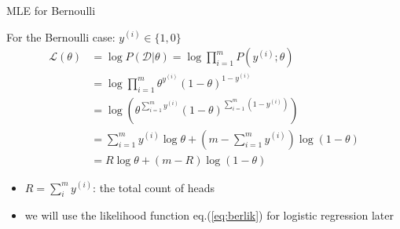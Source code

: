 \documentclass[ignorenonframetext,]{beamer}
\providecommand{\tightlist}{%
  \setlength{\itemsep}{0pt}\setlength{\parskip}{0pt}}
\newcommand{\di}[2]{\ensuremath{ #1^{(#2)}}}
\begin{document}
\begin{frame}{MLE for Bernoulli}
\protect\hypertarget{mle-for-bernoulli}{}

For the Bernoulli case: \(\di{y}{i} \in \{1,0\}\) \begin{align}
  \mathcal{L}(\theta) &= \log P(\mathcal{D}|\theta) = \log \prod_{i=1}^m P(\di{y}{i}; \theta)\nonumber \\
  &=  \log \prod_{i=1}^m \theta^{\di{y}{i}}(1-\theta)^{1-\di{y}{i}} \label{eq:berlik}\\
  &= \log (\theta^{\sum_{i=1}^m \di{y}{i}}(1-\theta)^{\sum_{i=1}^m (1-\di{y}{i})}) \nonumber\\
  &= \sum_{i=1}^m \di{y}{i} \log\theta + (m- \sum_{i=1}^m \di{y}{i}) \log (1-\theta) \nonumber\\
  &= R \log\theta + (m- R) \log (1-\theta) \nonumber
  \end{align}

\begin{itemize}
\tightlist
\item
  \(R=\sum_i^m \di{y}{i}\): the total count of heads
\item
  we will use the likelihood function eq.(\ref{eq:berlik}) for logistic
  regression later
\end{itemize}

\end{frame}
\end{document}
